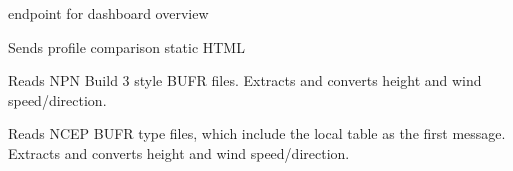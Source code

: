 \documentclass[letterpaper,10pt,english]{sphinxmanual}
\begin{document}

\begin{fulllineitems}
\label{\detokenize{index:compare_npn_to_model.overview}}
endpoint for dashboard overview

\end{fulllineitems}


\begin{fulllineitems}
\label{\detokenize{index:compare_npn_to_model.profile_html}}
Sends profile comparison static HTML

\end{fulllineitems}


\begin{fulllineitems}
\label{\detokenize{index:compare_npn_to_model.read_b3_bufr}}
Reads NPN Build 3 style BUFR files.
Extracts and converts height and wind speed/direction.

\end{fulllineitems}


\begin{fulllineitems}
\label{\detokenize{index:compare_npn_to_model.read_ncep_bufr}}
Reads NCEP BUFR type files,
which include the local table as the first message.
Extracts and converts height and wind speed/direction.

\end{fulllineitems}
\end{document}
